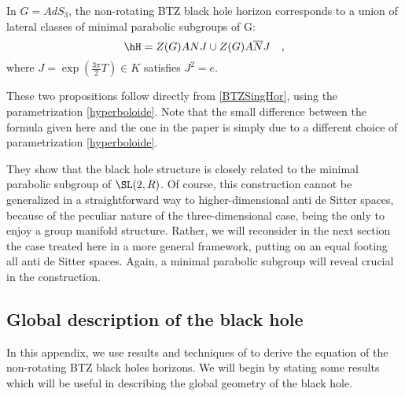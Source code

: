 \begin{proposition}		\label{PropLatClassANSLdeuxR}
	In $G=AdS_3$, the non-rotating BTZ black hole horizon corresponds to a union of lateral classes of minimal parabolic subgroups of G:
	\begin{equation}		\label{EqHorClassLatdeux}
		\hH = Z(G) A N J \cup Z(G) A \overline{N} J \quad,
	\end{equation}
	 where $J=\exp(\frac{3\pi}{2}T) \in K$ satisfies $J^2 = e$.
	\label{BTZHor}
\end{proposition}

These two propositions follow directly from \eqref{BTZSingHor}, using the parametrization \eqref{hyperboloide}. Note that the small difference between the formula given here and the one in the paper \cite{Keio} is simply due to a different choice of parametrization \eqref{hyperboloide}.

They show that the black hole structure is closely related to the minimal parabolic subgroup of $\SL(2,R)$. Of course, this construction cannot be generalized in a straightforward way to higher-dimensional anti de Sitter spaces, because of the peculiar nature of the three-dimensional case, being the only to enjoy a group manifold structure. Rather, we will reconsider in the next section the case treated here in a more general framework, putting on an equal footing all anti de Sitter spaces. Again, a minimal parabolic subgroup will reveal crucial in the construction.

\subsection{Global description of the black hole}

In this appendix, we use results and techniques of \cite{BTZB_un,BTZB_deux,Keio,Clement} to derive the equation of the non-rotating BTZ black holes horizons. We will begin by stating some results which will be useful in describing the global geometry of the black hole.

